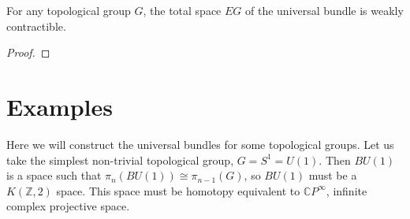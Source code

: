 \begin{lem}
For any topological group $G$, the total space $EG$ of the universal bundle is weakly contractible.
\end{lem}
\begin{proof}
\end{proof}



\section{Examples}


Here we will construct the universal bundles for some topological groups. Let us take the simplest non-trivial topological group, $G = S^1 = U(1)$. Then $BU(1)$ is a space such that $\pi_n(BU(1)) \cong \pi_{n-1}(G)$, so $BU(1)$ must be a $K(\mathbb Z,2)$ space. This space must be homotopy equivalent to $\mathbb CP^\infty$, infinite complex projective space.








